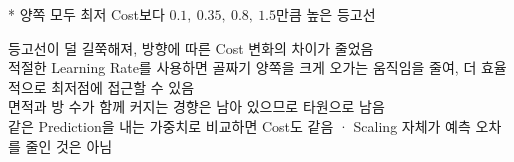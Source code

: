\documentclass[10pt,a4paper]{article}
\newif\ifanswers\answerstrue
\newcommand{\note}[1]{\par\hspace*{7mm}\begin{minipage}{\dimexpr\linewidth-7mm}\fontsize{7.5}{10.5}\selectfont\color{muted}* #1\end{minipage}\par}
\newcommand{\solution}[2]{\par\vspace{1.5mm}\begin{minipage}[t][#1][t]{\linewidth}\vspace{0pt}\fontsize{8}{11}\selectfont\ifanswers\leavevmode\color{answerred}#2\else{\color{grid}\hrule height .3pt}\fi\end{minipage}\par}
\begin{document}
\note{양쪽 모두 최저 Cost보다 $0.1,\ 0.35,\ 0.8,\ 1.5$만큼 높은 등고선}
\solution{32mm}{등고선이 덜 길쭉해져, 방향에 따른 Cost 변화의 차이가 줄었음\\적절한 Learning Rate를 사용하면 골짜기 양쪽을 크게 오가는 움직임을 줄여, 더 효율적으로 최저점에 접근할 수 있음\\면적과 방 수가 함께 커지는 경향은 남아 있으므로 타원으로 남음\\같은 Prediction을 내는 가중치로 비교하면 Cost도 같음 · Scaling 자체가 예측 오차를 줄인 것은 아님}
\end{document}
